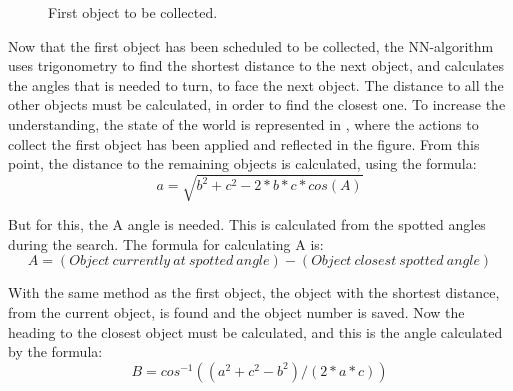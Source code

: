 \begin{figure}[H]
     \caption{\label{fig:object_navigation_first} First object to be collected.}
\end{figure}

Now that the first object has been scheduled to be collected, the NN-algorithm uses trigonometry to find the shortest distance to the next object, and calculates the angles that is needed to turn, to face the next object. The distance to all the other objects must be calculated, in order to find the closest one. To increase the understanding, the state of the world is represented in , where the actions to collect the first object has been applied and reflected in the figure. From this point, the distance to the remaining objects is calculated, using the formula:
\begin{equation}
a = \sqrt{ b^2 + c^2 - 2*b*c*cos(A) } \label{equation:a}
\end{equation}

But for this, the A angle is needed. This is calculated from the spotted angles during the search. The formula for calculating A is:
\begin{equation}
A = (Object~currently~at~spotted~angle) - (Object~closest~spotted~angle) \label{equation:AAngle}
\end{equation}

With the same method as the first object, the object with the shortest distance, from the current object, is found and the object number is saved. Now the heading to the closest object must be calculated, and this is the angle calculated by the formula:
\begin{equation}
B = cos^{-1}((a^2 + c^2 - b^2)/(2*a*c)) \label{equation:B}
\end{equation}

